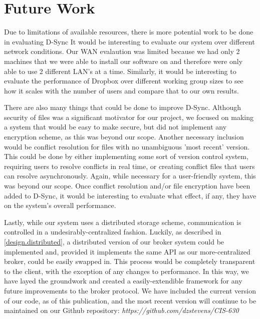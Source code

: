 \section{Future Work}
\label{discussion}
Due to limitations of available resources, there is 
more potential work to be done in evaluating D-Sync
It would be interesting to evaluate our system over different
network conditions. Our WAN evalaution was limited because
we had only 2 machines that we were able to install our 
software on and therefore were only able to use 2 different
LAN's at a time. Similarly, it would be interesting to 
evaluate the performance of Dropbox over different
working group sizes to see how it scales with the number 
of users and compare that to our own results.

There are also many things that could be done to improve D-Sync.
Although security of files was a significant motivator for our
project, we focused on making a system that would be easy to 
make secure, but did not implement any encryption scheme, 
as this was beyond our scope. Another necessary inclusion would
be conflict resolution for files with no unambiguous 'most recent'
version. This could be done by either implementing some sort of
version control system, requiring users to resolve conflicts in
real time, or creating conflict files that users can resolve
asynchronously. Again, while necessary for a user-friendly 
system, this was beyond our scope. Once conflict resolution and/or
file encryption have been added to D-Sync, it would be 
interesting to evaluate what effect, if any, they have on 
the system's overall performance.

Lastly, while our system uses a distributed storage scheme,
communication is controlled in a undesirably-centralized fashion.
Luckily, as described in \ref{design.distributed}, a distributed
version of our broker system could be implemented and, provided 
it implements the same API as our more-centralized broker, could
be easily swapped in. This process would be completely transparent
to the client, with the exception of any changes to performance.
In this way, we have layed the groundwork and created a easily-extendible
framework for any future improvements to the broker protocol. We have
included the current version of our code, as of this publication, and
the most recent version will continue to be maintained on our
Github repository: \emph{https://github.com/dzstevens/CIS-630}
